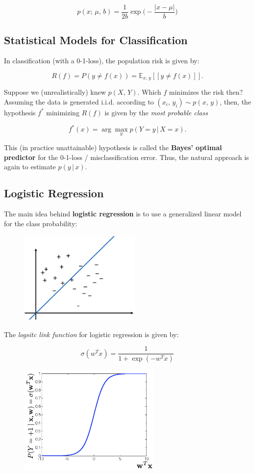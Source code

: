 \documentclass[a4paper]{extarticle}
\begin{document}
\[
    p(x; \, \mu, \, b) = \frac{1}{2b} \exp \Big(- \frac{|x - \mu|}{b} \Big)
\]

\subsection{Statistical Models for Classification}

In classification (with a 0-1-loss), the population risk is given by:

\[
    R(f) = P(y \neq f(x)) = \mathbb{E}_{x, \, y}[[y \neq f(x)]].
\]

Suppose we (unrealistically) knew $p(X, \, Y)$. Which $f$ minimizes the risk then? Assuming the data is generated i.i.d. according to $(x_i, \, y_i) \sim p(x, \, y)$, then, the hypothesis $f^*$ minimizing $R(f)$ is given by the \textit{most probable class}

\[
    f^*(x) = \arg \max_y p(Y = y \, | \, X = x).
\]

This (in practice unattainable) hypothesis is called the \textbf{Bayes' optimal predictor} for the 0-1-loss / misclassification error. Thus, the natural approach is again to estimate $p(y \, | \, x)$.

\subsection{Logistic Regression}

The main idea behind \textbf{logistic regression} is to use a generalized linear model for the class probability:

\begin{figure}[H]
    \includegraphics[width=6cm]{../images/IntroML_Fig10-6}
    \centering
\end{figure}

The \textit{logsitc link function} for logistic regression is given by:

\[
    \sigma(w^Tx) = \frac{1}{1 + \exp(-w^Tx)}
\]

\begin{figure}[H]
    \includegraphics[width=7cm]{../images/IntroML_Fig10-7}
    \centering
\end{figure}
\end{document}
